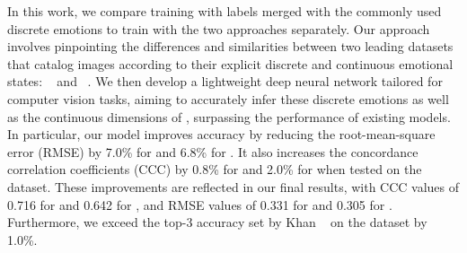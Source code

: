 In this work, we compare training with \va{} labels merged with the commonly used discrete emotions to train with the two approaches separately. 
Our approach involves pinpointing the differences and similarities between two leading datasets that catalog images according to their explicit discrete and continuous emotional states: \affectnet~\cite{mollahosseini2017affectnet} and \emotic{}~\cite{kosti_emotic_2017}. 
We then develop a lightweight deep neural network tailored for computer vision tasks, aiming to accurately infer these discrete emotions as well as the continuous dimensions of \va{}, surpassing the performance of existing models. In particular, our model improves accuracy by reducing the root-mean-square error  (RMSE) by 7.0\% for \val{} and 6.8\% for \aro{}. It also increases the concordance correlation coefficients (CCC) by 0.8\% for \val{} and 2.0\% for \aro{} when tested on the \affectnet{} dataset. These improvements are reflected in our final results, with CCC values of 0.716 for \val{} and 0.642 for \aro{}, and RMSE values of 0.331 for \val{} and 0.305 for \aro{}. Furthermore, we exceed the top-3 accuracy set by Khan \etal~\cite{khan2024focusclip} on the \emotic{} dataset by 1.0\%. %

